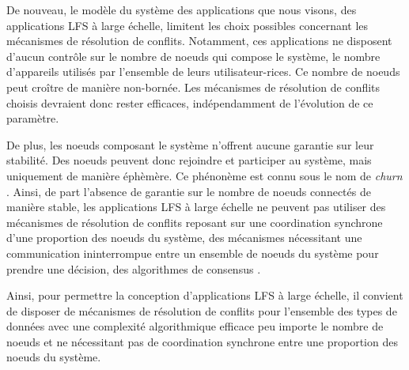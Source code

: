 De nouveau, le modèle du système des applications que nous visons, \ie des applications \ac{LFS} à large échelle, limitent les choix possibles concernant les mécanismes de résolution de conflits.
Notamment, ces applications ne disposent d'aucun contrôle sur le nombre de noeuds qui compose le système, \ie le nombre d'appareils utilisés par l'ensemble de leurs utilisateur-rices.
Ce nombre de noeuds peut croître de manière non-bornée.
Les mécanismes de résolution de conflits choisis devraient donc rester efficaces, indépendamment de l'évolution de ce paramètre.

De plus, les noeuds composant le système n'offrent aucune garantie sur leur stabilité.
Des noeuds peuvent donc rejoindre et participer au système, mais uniquement de manière éphèmère.
Ce phénonème est connu sous le nom de \emph{churn} \cite{understandingChurnP2PNetworks2006}.
Ainsi, de part l'absence de garantie sur le nombre de noeuds connectés de manière stable, les applications \ac{LFS} à large échelle ne peuvent pas utiliser des mécanismes de résolution de conflits reposant sur une coordination synchrone d'une proportion des noeuds du système, \ie des mécanismes nécessitant une communication ininterrompue entre un ensemble de noeuds du système pour prendre une décision, \eg des algorithmes de consensus \cite{1998-paxos-lamport, 2014-raft-ongaro}.

Ainsi, pour permettre la conception d'applications \ac{LFS} à large échelle, il convient de disposer de mécanismes de résolution de conflits pour l'ensemble des types de données avec une complexité algorithmique efficace peu importe le nombre de noeuds et ne nécessitant pas de coordination synchrone entre une proportion des noeuds du système.
